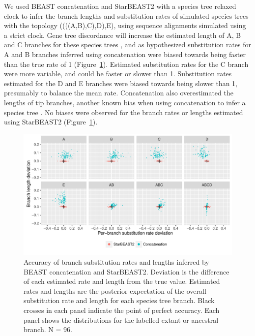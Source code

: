 \documentclass[12pt]{article}
\begin{document}
We used BEAST concatenation and StarBEAST2 with a species tree relaxed clock
to infer the branch lengths and substitution rates of simulated species trees
with the topology ((((A,B),C),D),E), using sequence alignments simulated using
a strict clock. Gene tree discordance will increase the estimated length of A,
B and C branches for these species trees \citep{Mendes01072016}, and as
hypothesized substitution rates for A and B branches inferred using
concatenation were biased towards being faster than the true rate of 1
(Figure~\ref{fig:spilsRates}). Estimated substitution rates for the C branch
were more variable, and could be faster or slower than 1. Substitution rates
estimated for the D and E branches were biased towards being slower than 1,
presumably to balance the mean rate. Concatenation also overestimated the
lengths of tip branches, another known bias when using concatenation to infer
a species tree \citep{Ogilvie01052016}. No biases were observed for the branch
rates or lengths estimated using StarBEAST2 (Figure~\ref{fig:spilsRates}).

\begin{figure}[htb!]
\centering
\includegraphics[width=\textwidth]{scatter.pdf}
\caption
{Accuracy of branch substitution rates and lengths inferred by BEAST
concatenation and StarBEAST2. Deviation is the difference of each estimated
rate and length from the true value. Estimated rates and lengths are the
posterior expectation of the overall substitution rate and length for each
species tree branch. Black crosses in each panel indicate the point of perfect
accuracy. Each panel shows the distributions for the labelled extant or
ancestral branch. N = 96.}
\label{fig:spilsRates}
\end{figure}
\end{document}
